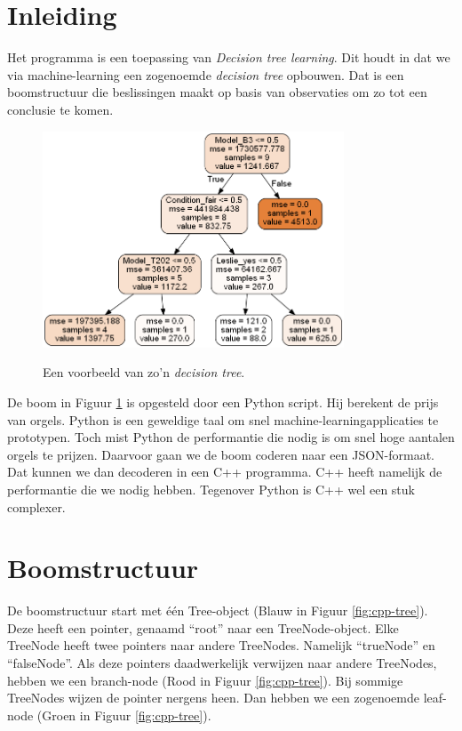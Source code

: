 \section{Inleiding}
Het programma is een toepassing van \textit{Decision tree learning}.\cite{wiki:dtl} Dit houdt in dat we via machine-learning een zogenoemde \textit{decision tree} opbouwen. Dat is een boomstructuur die beslissingen maakt op basis van observaties om zo tot een conclusie te komen.

\begin{figure}[ht]
    \centering
    \includegraphics[width=0.8\textwidth]{illustraties/tree}
    \caption{Een voorbeeld van zo'n \textit{decision tree}.}
    \cite{git:github}
    \label{fig:tree}
\end{figure}

De boom in Figuur \ref{fig:tree} is opgesteld door een Python script. Hij berekent de prijs van orgels. Python is een geweldige taal om snel machine-learningapplicaties te prototypen. Toch mist Python de performantie die nodig is om snel hoge aantalen orgels te prijzen. Daarvoor gaan we de boom coderen naar een JSON-formaat. Dat kunnen we dan decoderen in een C++ programma. C++ heeft namelijk de performantie die we nodig hebben. Tegenover Python is C++ wel een stuk complexer.

\clearpage

\section{Boomstructuur}
De boomstructuur start met één Tree-object (Blauw in Figuur \ref{fig:cpp-tree}). Deze heeft een pointer, genaamd ``root'' naar een TreeNode-object. Elke TreeNode heeft twee pointers naar andere TreeNodes. Namelijk ``trueNode'' en ``falseNode''. Als deze pointers daadwerkelijk verwijzen naar andere TreeNodes, hebben we een branch-node (Rood in Figuur \ref{fig:cpp-tree}). Bij sommige TreeNodes wijzen de pointer nergens heen. Dan hebben we een zogenoemde leaf-node (Groen in Figuur \ref{fig:cpp-tree}).

